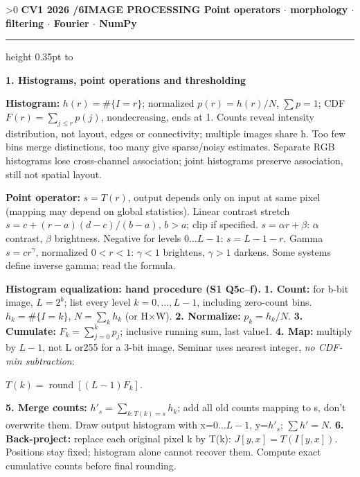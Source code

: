 \documentclass[a4paper]{article}
\newcommand{\key}[1]{\textbf{#1}}
\newcommand{\Topic}[1]{\par\vspace{1.7pt}\noindent
  {\fontsize{7.7}{8.0}\selectfont\bfseries #1}\par\vspace{0.3pt}}
\newcommand{\eq}[1]{\par\noindent\mbox{\(\displaystyle #1\)}\par}
\newcounter{sheet}
\newcounter{sheetcolumn}
\newlength{\colwidth}
\newcommand{\Sheet}[2]{\ifnum\value{sheet}>0\newpage\fi
  \stepcounter{sheet}\setcounter{sheetcolumn}{0}
  {\fontsize{8.5}{9}\selectfont\bfseries CV1 2026 \quad \thesheet/6\quad #1
  \hfill {\fontsize{6.3}{7}\selectfont #2}}\par
  \vspace{-1pt}\hrule height 0.35pt\vspace{2pt}\noindent
  \hbox to\textwidth\bgroup\ignorespaces}
\newenvironment{sheetcol}[1][7.0]{\stepcounter{sheetcolumn}
  \begin{lrbox}{\columnbox}\begin{minipage}[t]{\colwidth}\vspace{0pt}
  \fontsize{#1}{\dimexpr#1pt+0.6pt\relax}\selectfont}
  {\end{minipage}\end{lrbox}
  \typeout{CV1COL|\thesheet|\thesheetcolumn|\the\dimexpr\ht\columnbox+\dp\columnbox\relax}
  \usebox{\columnbox}\ignorespacesafterend}
\begin{document}
\Sheet{IMAGE PROCESSING}{Point operators \(\cdot\) morphology \(\cdot\) filtering \(\cdot\) Fourier \(\cdot\) NumPy}
\begin{sheetcol}[6.45]
\Topic{1. Histograms, point operations and thresholding}
\key{Histogram:} \(h(r)=\#\{I=r\}\); normalized \(p(r)=h(r)/N\), \(\sum p=1\); CDF \(F(r)=\sum_{j\le r}p(j)\), nondecreasing, ends at 1. Counts reveal intensity distribution, not layout, edges or connectivity; multiple images share h. Too few bins merge distinctions, too many give sparse/noisy estimates. Separate RGB histograms lose cross-channel association; joint histograms preserve association, still not spatial layout.

\key{Point operator:} \(s=T(r)\), output depends only on input at same pixel (mapping may depend on global statistics). Linear contrast stretch \(s=c+(r-a)(d-c)/(b-a)\), \(b>a\); clip if specified. \(s=\alpha r+\beta\): \(\alpha\) contrast, \(\beta\) brightness. Negative for levels \(0\ldots L-1\): \(s=L-1-r\). Gamma \(s=cr^\gamma\), normalized \(0<r<1\): \(\gamma<1\) brightens, \(\gamma>1\) darkens. Some systems define inverse gamma; read the formula.

\key{Histogram equalization: hand procedure (S1 Q5c--f).}
\key{1. Count:} for b-bit image, \(L=2^b\); list every level \(k=0,\ldots,L-1\), including zero-count bins. \(h_k=\#\{I=k\}\), \(N=\sum_kh_k\) (or H\(\times\)W).
\key{2. Normalize:} \(p_k=h_k/N\).
\key{3. Cumulate:} \(F_k=\sum_{j=0}^kp_j\); inclusive running sum, last value1.
\key{4. Map:} multiply by \(L-1\), not L or255 for a 3-bit image. Seminar uses nearest integer, \emph{no CDF-min subtraction}:
\eq{T(k)=\operatorname{round}[(L-1)F_k].}
\key{5. Merge counts:} \(h'_s=\sum_{k:T(k)=s}h_k\); add all old counts mapping to s, don't overwrite them. Draw output histogram with x=\(0\ldots L-1\), y=\(h'_s\); \(\sum h'=N\).
\key{6. Back-project:} replace each original pixel k by T(k): \(J[y,x]=T(I[y,x])\). Positions stay fixed; histogram alone cannot recover them. Compute exact cumulative counts before final rounding.


\end{sheetcol}
\end{document}
